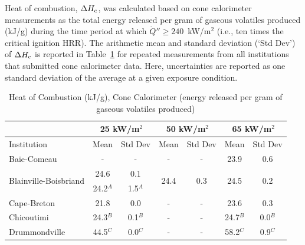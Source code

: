 \documentclass{book}
\begin{document}
Heat of combustion, $\Delta H_{\rm c}$, was calculated based on cone calorimeter measurements as the total energy released per gram of gaseous volatiles produced (kJ/g) during the time period at which $\dot{Q}'' \ge 240$~kW/m$^2$ (i.e., ten times the critical ignition HRR). The arithmetic mean and standard deviation (`Std Dev') of $\Delta H_{\rm c}$ is reported in Table~\ref{Table_13} for repeated measurements from all institutions that submitted cone calorimeter data. Here, uncertainties are reported as one standard deviation of the average at a given exposure condition.

\begin{table}[h!]
\caption{Heat of Combustion (kJ/g), Cone Calorimeter (energy released per gram of gaseous volatiles produced)}
\label{Table_13}
\begin{center}
\begin{tabular}{|l|cc|cc|cc|}
\hline
                                        & \multicolumn{2}{|c|}{25 kW/m$^2$} &  \multicolumn{2}{|c|}{50 kW/m$^2$}             & \multicolumn{2}{|c|}{65 kW/m$^2$}                 \\ \hline
Institution                             & Mean     & Std Dev                & Mean                  & Std Dev                & Mean                  & Std Dev                   \\ \hline
Baie-Comeau                             & -        & -                      & -                     & -                      & 23.9                  & 0.6                       \\
\multirow{2}{*}{Blainville-Boisbriand}  & 24.6     & 0.1                    & \multirow{2}{*}{24.4} & \multirow{2}{*}{0.3}   & \multirow{2}{*}{24.5} & \multirow{2}{*}{0.2}      \\
                                        & 24.2$^A$ & 1.5$^A$                &                       &                        &                       &                           \\
Cape-Breton                             & 21.8     & 0.0                    & -                     & -                      & 23.6                  & 0.3                       \\
Chicoutimi                              & 24.3$^B$ & 0.1$^B$                & -                     & -                      & 24.7$^B$              & 0.0$^B$                   \\
Drummondville                           & 44.5$^C$ & 0.0$^C$                & -                     & -                      & 58.2$^C$              & 0.9$^C$                   \\

\end{tabular}
\end{center}
\end{table}
\end{document}
